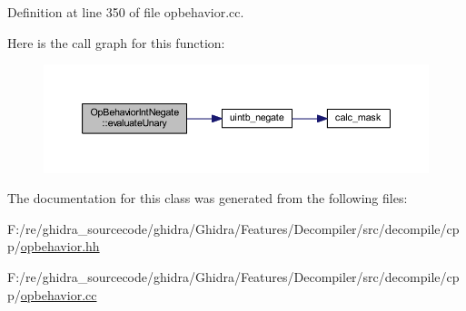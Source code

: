 Definition at line 350 of file opbehavior.\+cc.

Here is the call graph for this function\+:
\nopagebreak
\begin{figure}[H]
\begin{center}
\leavevmode
\includegraphics[width=350pt]{class_op_behavior_int_negate_a055b850c85869cf54c6bf23699d8be5a_cgraph}
\end{center}
\end{figure}


The documentation for this class was generated from the following files\+:\begin{DoxyCompactItemize}
\item 
F\+:/re/ghidra\+\_\+sourcecode/ghidra/\+Ghidra/\+Features/\+Decompiler/src/decompile/cpp/\mbox{\hyperlink{opbehavior_8hh}{opbehavior.\+hh}}\item 
F\+:/re/ghidra\+\_\+sourcecode/ghidra/\+Ghidra/\+Features/\+Decompiler/src/decompile/cpp/\mbox{\hyperlink{opbehavior_8cc}{opbehavior.\+cc}}\end{DoxyCompactItemize}

